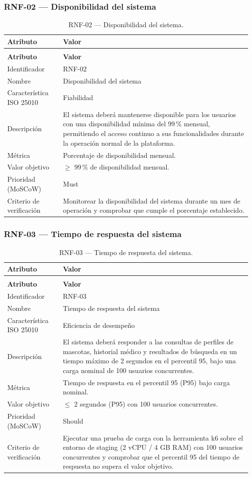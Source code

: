 \documentclass[journal,onecolumn]{IEEEtran}
\makeatletter
\newenvironment{atributos}[2]{%
	\small
	\begin{longtable}{@{}>{\raggedright\arraybackslash}p{4.2cm} >{\raggedright\arraybackslash}p{11.2cm}@{}}
		\caption{#2}\label{tab:#1}\\
		\toprule
		\textbf{Atributo} & \textbf{Valor} \\
		\midrule
		\endfirsthead
		\multicolumn{2}{@{}l}{\small\itshape (continuación)}\\
		\toprule
		\textbf{Atributo} & \textbf{Valor} \\
		\midrule
		\endhead
		\bottomrule
		\endlastfoot
	}{%
	\end{longtable}
	\normalsize
}
\makeatother
\begin{document}
	\subsubsection{RNF-02 --- Disponibilidad del sistema}
	
	\begin{atributos}{RNF-02}{RNF-02 --- Disponibilidad del sistema.}
		Identificador & RNF-02 \\
		Nombre & Disponibilidad del sistema \\
		Característica ISO 25010 & Fiabilidad \\
		Descripción & El sistema deberá mantenerse disponible para los usuarios con una disponibilidad mínima del 99\,\% mensual, permitiendo el acceso continuo a sus funcionalidades durante la operación normal de la plataforma. \\
		Métrica & Porcentaje de disponibilidad mensual. \\
		Valor objetivo & $\geq$ 99\,\% de disponibilidad mensual. \\
		Prioridad (MoSCoW) & Must \\
		Criterio de verificación & Monitorear la disponibilidad del sistema durante un mes de operación y comprobar que cumple el porcentaje establecido. \\
	\end{atributos}
	
	\subsubsection{RNF-03 --- Tiempo de respuesta del sistema}
	
	\begin{atributos}{RNF-03}{RNF-03 --- Tiempo de respuesta del sistema.}
		Identificador & RNF-03 \\
		Nombre & Tiempo de respuesta del sistema \\
		Característica ISO 25010 & Eficiencia de desempeño \\
		Descripción & El sistema deberá responder a las consultas de perfiles de mascotas, historial médico y resultados de búsqueda en un tiempo máximo de 2 segundos en el percentil 95, bajo una carga nominal de 100 usuarios concurrentes. \\
		Métrica & Tiempo de respuesta en el percentil 95 (P95) bajo carga nominal. \\
		Valor objetivo & $\leq$ 2 segundos (P95) con 100 usuarios concurrentes. \\
		Prioridad (MoSCoW) & Should \\
		Criterio de verificación & Ejecutar una prueba de carga con la herramienta k6 sobre el entorno de staging (2 vCPU / 4 GB RAM) con 100 usuarios concurrentes y comprobar que el percentil 95 del tiempo de respuesta no supera el valor objetivo. \\
	\end{atributos}
	
\end{document}
